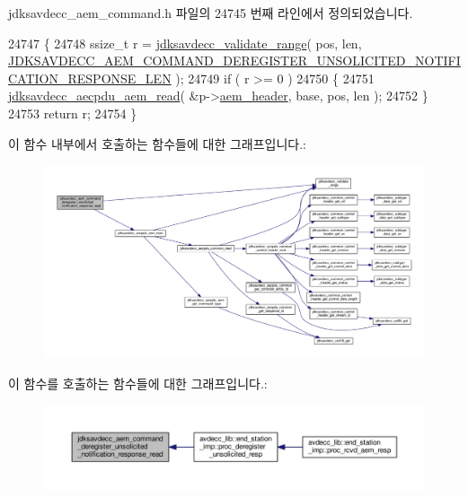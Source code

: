 jdksavdecc\+\_\+aem\+\_\+command.\+h 파일의 24745 번째 라인에서 정의되었습니다.


\begin{DoxyCode}
24747 \{
24748     ssize\_t r = \hyperlink{group__util_ga9c02bdfe76c69163647c3196db7a73a1}{jdksavdecc\_validate\_range}( pos, len, 
      \hyperlink{group__command__deregister__unsolicited__notification__response_ga6b1095fb900d4ad3d966caa72cde2dca}{JDKSAVDECC\_AEM\_COMMAND\_DEREGISTER\_UNSOLICITED\_NOTIFICATION\_RESPONSE\_LEN}
       );
24749     \textcolor{keywordflow}{if} ( r >= 0 )
24750     \{
24751         \hyperlink{group__aecpdu__aem_gae2421015dcdce745b4f03832e12b4fb6}{jdksavdecc\_aecpdu\_aem\_read}( &p->\hyperlink{structjdksavdecc__aem__command__deregister__unsolicited__notification__response_ae1e77ccb75ff5021ad923221eab38294}{aem\_header}, base, pos, len );
24752     \}
24753     \textcolor{keywordflow}{return} r;
24754 \}
\end{DoxyCode}


이 함수 내부에서 호출하는 함수들에 대한 그래프입니다.\+:
\nopagebreak
\begin{figure}[H]
\begin{center}
\leavevmode
\includegraphics[width=350pt]{group__command__deregister__unsolicited__notification__response_gae9710f948e0509eb46a644040bd1d703_cgraph}
\end{center}
\end{figure}




이 함수를 호출하는 함수들에 대한 그래프입니다.\+:
\nopagebreak
\begin{figure}[H]
\begin{center}
\leavevmode
\includegraphics[width=350pt]{group__command__deregister__unsolicited__notification__response_gae9710f948e0509eb46a644040bd1d703_icgraph}
\end{center}
\end{figure}


